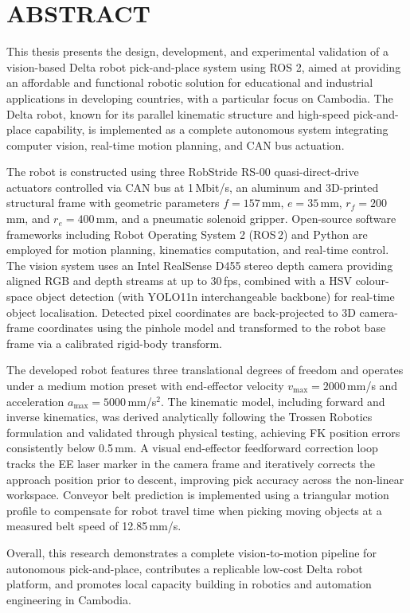 \section*{\centering ABSTRACT}
\hspace{1.27cm}
This thesis presents the design, development, and experimental validation of a vision-based Delta robot pick-and-place system using ROS 2, aimed at providing an affordable and functional robotic solution for educational and industrial applications in developing countries, with a particular focus on Cambodia. The Delta robot, known for its parallel kinematic structure and high-speed pick-and-place capability, is implemented as a complete autonomous system integrating computer vision, real-time motion planning, and CAN bus actuation.

\par
\hspace{1.27cm}
The robot is constructed using three RobStride RS-00 quasi-direct-drive actuators controlled via CAN bus at 1\,Mbit/s, an aluminum and 3D-printed structural frame with geometric parameters $f=157$\,mm, $e=35$\,mm, $r_f=200$\,mm, and $r_e=400$\,mm, and a pneumatic solenoid gripper. Open-source software frameworks including Robot Operating System 2 (ROS\,2) and Python are employed for motion planning, kinematics computation, and real-time control. The vision system uses an Intel RealSense D455 stereo depth camera providing aligned RGB and depth streams at up to 30\,fps, combined with a HSV colour-space object detection (with YOLO11n 
interchangeable backbone) for real-time object localisation. Detected pixel coordinates are back-projected to 3D camera-frame coordinates using the pinhole model and transformed to the robot base frame via a calibrated rigid-body transform.

\par
\hspace{1.27cm}
The developed robot features three translational degrees of freedom and operates under a medium motion preset with end-effector velocity $v_{\max}=2000$\,mm/s and acceleration $a_{\max}=5000$\,mm/s$^2$. The kinematic model, including forward and inverse kinematics, was derived analytically following the Trossen Robotics formulation and validated through physical testing, achieving FK position errors consistently below 0.5\,mm. A visual end-effector feedforward correction loop tracks the EE laser marker in the camera frame and iteratively corrects the approach position prior to descent, improving pick accuracy across the non-linear workspace. Conveyor belt prediction is implemented using a triangular motion profile to compensate for robot travel time when picking moving objects at a measured belt speed of 12.85\,mm/s.

\par
\hspace{1.27cm}
Overall, this research demonstrates a complete vision-to-motion pipeline for autonomous pick-and-place, contributes a replicable low-cost Delta robot platform, and promotes local capacity building in robotics and automation engineering in Cambodia.
